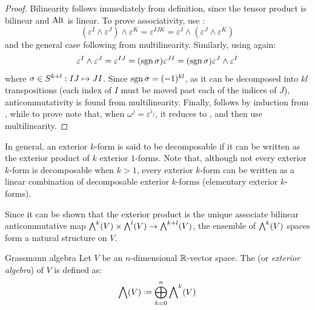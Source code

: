 \begin{proofbox}
  \begin{proof}
    Bilinearity follows immediately from definition, since the tensor product is bilinear and $ \operatorname{Alt} $ is linear. To prove associativity, use :
    \begin{equation*}
      (\varepsilon^I \wedge \varepsilon^J) \wedge \varepsilon^K = \varepsilon^{IJK} = \varepsilon^I \wedge (\varepsilon^J \wedge \varepsilon^K)
    \end{equation*}
    and the general case following from multilinearity. Similarly, using  again:
    \begin{equation*}
      \varepsilon^I \wedge \varepsilon^J = \varepsilon^{IJ} = (\mathrm{sgn}\,\sigma) \varepsilon^{JI} = (\mathrm{sgn}\,\sigma) \varepsilon^J \wedge \varepsilon^I
    \end{equation*}
    where $ \sigma \in S^{k+l} : IJ \mapsto JI $. Since $ \mathrm{sgn}\,\sigma = (-1)^{kl} $, as it can be decomposed into $ kl $ transpositions (each index of $ I $ must be moved past each of the indices of $ J $), anticommutativity is found from multilinearity. Finally,  follows by induction from , while to prove  note that, when $ \omega^j = \varepsilon^{i_j} $, it reduces to , and then use multilinearity.
  \end{proof}
\end{proofbox}

In general, an exterior $ k $-form is said to be decomposable if it can be written as the exterior product of $ k $ exterior $ 1 $-forms. Note that, although not every exterior $ k $-form is decomposable when $ k > 1 $, every exterior $ k $-form can be written as a linear combination of decomposable exterior $ k $-forms (elementary exterior $ k $-forms).

Since it can be shown that the exterior product is the unique associate bilinear anticommutative map $ {\bigwedge}^{k}(V) \times {\bigwedge}^{l}(V) \rightarrow {\bigwedge}^{k+l}(V) $, the ensemble of $ {\bigwedge}^{k}(V) $ spaces form a natural structure on $ V $.

\begin{definition}{Grassmann algebra}{}
  Let $ V $ be an $ n $-dimensional $ \mathbb{R} $-vector space. The  (or \emph{exterior algebra}) of $ V $ is defined as:
  \begin{equation}
    \ga(V) \defeq \bigoplus_{k = 0}^n \lv{k}(V)
  \end{equation}
\end{definition}

